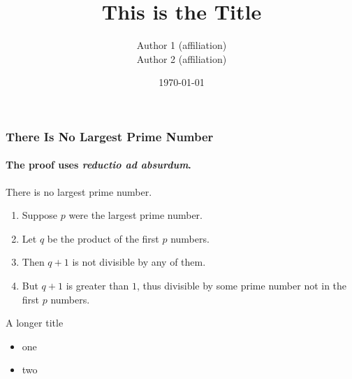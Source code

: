 \documentclass{beamer}
\title{This is the Title}
\date{\today}
\author{Author 1 (affiliation)\\ Author 2 (affiliation)}
\begin{document}
\begin{frame}
\titlepage
\end{frame}

\setcounter{framenumber}{0}


\begin{frame}
\frametitle{There Is No Largest Prime Number}
\framesubtitle{The proof uses \textit{reductio ad absurdum}.}
\begin{theorem}
There is no largest prime number. \end{theorem}
\begin{enumerate}
\item<1-| alert@1> Suppose $p$ were the largest prime number.
\item<2-> Let $q$ be the product of the first $p$ numbers.
\item<3-> Then $q+1$ is not divisible by any of them.
\item<1-> But $q + 1$ is greater than $1$, thus divisible by some prime
number not in the first $p$ numbers.

\end{enumerate}
\end{frame}



\begin{frame}{A longer title}
\begin{itemize}
\item one
\item two
\end{itemize}
\end{frame}
\end{document}
